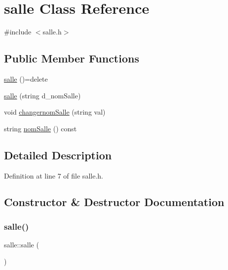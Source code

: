 \hypertarget{classsalle}{}\section{salle Class Reference}
\label{classsalle}


{\ttfamily \#include $<$salle.\+h$>$}

\subsection*{Public Member Functions}
\begin{DoxyCompactItemize}
\item 
\hyperlink{classsalle_afff557d088f3a88fea869c69c4a27034}{salle} ()=delete
\item 
\hyperlink{classsalle_a31f6417c7498ad8c11ca6d4a5a7fe756}{salle} (string d\+\_\+nom\+Salle)
\item 
void \hyperlink{classsalle_acff7bb9d121b2902baf994480c0a915b}{changernom\+Salle} (string val)
\item 
string \hyperlink{classsalle_a9aa203edb5af116d0b4200390408d573}{nom\+Salle} () const
\end{DoxyCompactItemize}


\subsection{Detailed Description}


Definition at line 7 of file salle.\+h.



\subsection{Constructor \& Destructor Documentation}
\hypertarget{classsalle_afff557d088f3a88fea869c69c4a27034}{}\label{classsalle_afff557d088f3a88fea869c69c4a27034} 
\subsubsection{\texorpdfstring{salle()}{salle()}\hspace{0.1cm}{\footnotesize\ttfamily [1/2]}}
{\footnotesize\ttfamily salle\+::salle (\begin{DoxyParamCaption}{ }\end{DoxyParamCaption})\hspace{0.3cm}{\ttfamily [delete]}}

